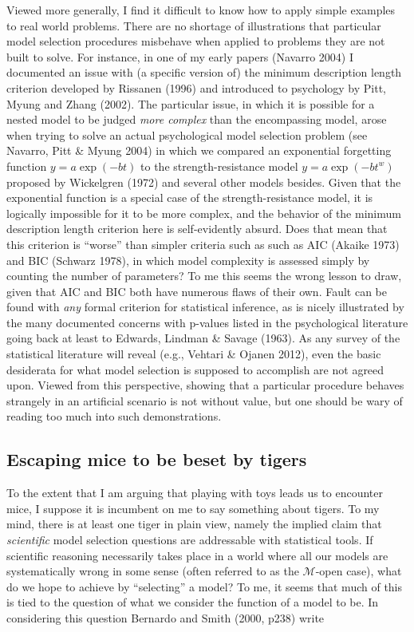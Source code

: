 \documentclass[doc]{apa6}
\theoremstyle{definition}
\theoremstyle{definition}
\theoremstyle{definition}
\theoremstyle{remark}
\begin{document}
Viewed more generally, I find it difficult to know how to apply simple
examples to real world problems. There are no shortage of illustrations
that particular model selection procedures misbehave when applied to
problems they are not built to solve. For instance, in one of my early
papers (Navarro 2004) I documented an issue with (a specific version of)
the minimum description length criterion developed by Rissanen (1996)
and introduced to psychology by Pitt, Myung and Zhang (2002). The
particular issue, in which it is possible for a nested model to be
judged \emph{more complex} than the encompassing model, arose when
trying to solve an actual psychological model selection problem (see
Navarro, Pitt \& Myung 2004) in which we compared an exponential
forgetting function \(y=a \exp(-bt)\) to the strength-resistance model
\(y=a \exp(-bt^w)\) proposed by Wickelgren (1972) and several other
models besides. Given that the exponential function is a special case of
the strength-resistance model, it is logically impossible for it to be
more complex, and the behavior of the minimum description length
criterion here is self-evidently absurd. Does that mean that this
criterion is \enquote{worse} than simpler criteria such as such as AIC
(Akaike 1973) and BIC (Schwarz 1978), in which model complexity is
assessed simply by counting the number of parameters? To me this seems
the wrong lesson to draw, given that AIC and BIC both have numerous
flaws of their own. Fault can be found with \emph{any} formal criterion
for statistical inference, as is nicely illustrated by the many
documented concerns with p-values listed in the psychological literature
going back at least to Edwards, Lindman \& Savage (1963). As any survey
of the statistical literature will reveal (e.g., Vehtari \& Ojanen
2012), even the basic desiderata for what model selection is supposed to
accomplish are not agreed upon. Viewed from this perspective, showing
that a particular procedure behaves strangely in an artificial scenario
is not without value, but one should be wary of reading too much into
such demonstrations.

\subsection{Escaping mice to be beset by
tigers}\label{escaping-mice-to-be-beset-by-tigers}

To the extent that I am arguing that playing with toys leads us to
encounter mice, I suppose it is incumbent on me to say something about
tigers. To my mind, there is at least one tiger in plain view, namely
the implied claim that \emph{scientific} model selection questions are
addressable with statistical tools. If scientific reasoning necessarily
takes place in a world where all our models are systematically wrong in
some sense (often referred to as the \(\mathcal{M}\)-open case), what do
we hope to achieve by \enquote{selecting} a model? To me, it seems that
much of this is tied to the question of what we consider the function of
a model to be. In considering this question Bernardo and Smith (2000,
p238) write
\end{document}
